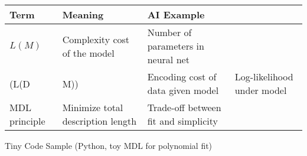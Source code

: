 \documentclass[
  letterpaper,
  DIV=11,
  numbers=noendperiod]{scrreprt}
\begin{document}
\begin{longtable}[]{@{}
  >{\raggedright\arraybackslash}p{}
  >{\raggedright\arraybackslash}p{}
  >{\raggedright\arraybackslash}p{}
  >{\raggedright\arraybackslash}p{}@{}}
\toprule\noalign{}
\begin{minipage}[b]{\linewidth}\raggedright
Term
\end{minipage} & \begin{minipage}[b]{\linewidth}\raggedright
Meaning
\end{minipage} & \begin{minipage}[b]{\linewidth}\raggedright
AI Example
\end{minipage} & \begin{minipage}[b]{\linewidth}\raggedright
\end{minipage} \\
\midrule\noalign{}
\endhead
\bottomrule\noalign{}
\endlastfoot
\(L(M)\) & Complexity cost of the model & Number of parameters in neural
net & \\
(L(D & M)) & Encoding cost of data given model & Log-likelihood under
model \\
MDL principle & Minimize total description length & Trade-off between
fit and simplicity & \\
\end{longtable}

Tiny Code Sample (Python, toy MDL for polynomial fit)
\end{document}
